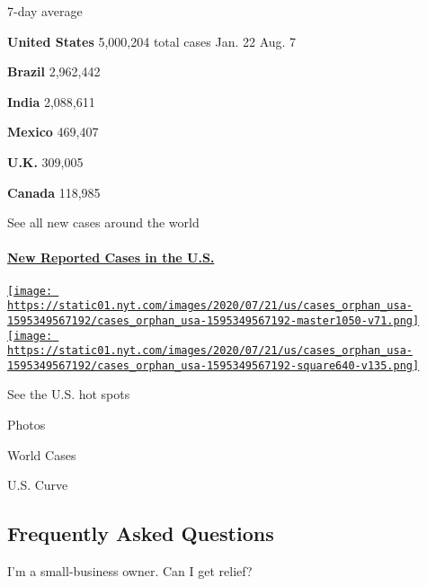 7-day average

\textbf{United States} 5,000,204 total cases Jan. 22 Aug. 7
\href{https://www.nytimes.com/interactive/2020/world/americas/brazil-coronavirus-cases.html}{}

\textbf{Brazil} 2,962,442
\href{https://www.nytimes.com/interactive/2020/world/asia/india-coronavirus-cases.html}{}

\textbf{India} 2,088,611
\href{https://www.nytimes.com/interactive/2020/world/americas/mexico-coronavirus-cases.html}{}

\textbf{Mexico} 469,407
\href{https://www.nytimes.com/interactive/2020/world/europe/united-kingdom-coronavirus-cases.html}{}

\textbf{U.K.} 309,005
\href{https://www.nytimes.com/interactive/2020/world/canada/canada-coronavirus-cases.html}{}

\textbf{Canada} 118,985

\href{https://www.nytimes.com/interactive/2020/world/coronavirus-maps.html}{}

See all new cases around the world

\hypertarget{new-reported-cases-in-the-us}{%
\paragraph{\texorpdfstring{\href{https://www.nytimes.com/interactive/2020/us/coronavirus-us-cases.html}{New
Reported Cases in the
U.S.}}{New Reported Cases in the U.S.}}\label{new-reported-cases-in-the-us}}

\href{https://www.nytimes.com/interactive/2020/us/coronavirus-us-cases.html}{\texttt{[image: https://static01.nyt.com/images/2020/07/21/us/cases\_orphan\_usa-1595349567192/cases\_orphan\_usa-1595349567192-master1050-v71.png]}
\texttt{[image: https://static01.nyt.com/images/2020/07/21/us/cases\_orphan\_usa-1595349567192/cases\_orphan\_usa-1595349567192-square640-v135.png]}}

See the U.S. hot spots

Photos

World Cases

U.S. Curve

\hypertarget{frequently-asked-questions}{%
\subsection{Frequently Asked
Questions}\label{frequently-asked-questions}}

I'm a small-business owner. Can I get relief?

